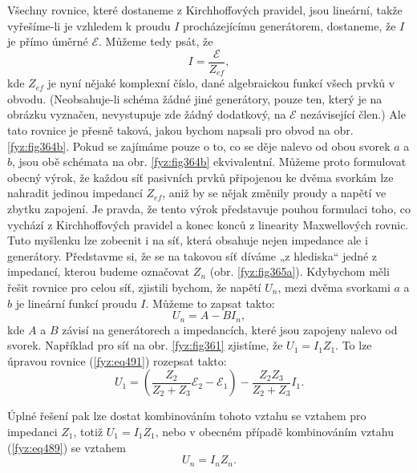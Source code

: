   Všechny rovnice, které dostaneme z Kirchhoffových pravidel, jsou lineární, takže vyřešíme-li je 
  vzhledem k proudu \(I\) procházejícímu generátorem, dostaneme, že \(I\) je přímo úměrné 
  \(\mathscr{E}\). Můžeme tedy psát, že
  \begin{equation*}
    I = \frac{\mathscr{E}}{Z_{ef}},
  \end{equation*}
  kde \(Z_{ef}\) je nyní nějaké komplexní číslo, dané algebraickou funkcí všech prvků v obvodu. 
  (Neobsahuje-li schéma žádné jiné generátory, pouze ten, který je na obrázku vyznačen, nevystupuje 
  zde žádný dodatkový, na \(\mathscr{E}\) nezávisející člen.) Ale tato rovnice je přesně taková, 
  jakou bychom napsali pro obvod na obr. \ref{fyz:fig364b}. Pokud se zajímáme pouze o to, co se 
  děje nalevo od obou svorek \(a\) a \(b\), jsou obě schémata na obr. \ref{fyz:fig364b} 
  ekvivalentní. Můžeme proto formulovat obecný výrok, že každou síť pasivních prvků připojenou ke 
  dvěma svorkám lze nahradit jedinou impedancí \(Z_{ef}\), aniž by se nějak změnily proudy a napětí 
  ve zbytku zapojení. Je pravda, že tento výrok představuje pouhou formulaci toho, co vychází z 
  Kirchhoffových pravidel a konec konců z linearity Maxwellových rovnic. Tuto myšlenku lze zobecnit 
  i na síť, která obsahuje nejen impedance ale i generátory. Představme si, že se na takovou síť 
  díváme „z hlediska“ jedné z impedancí, kterou budeme označovat \(Z_n\) (obr. \ref{fyz:fig365a}). 
  Kdybychom měli řešit rovnice pro celou síť, zjistili bychom, že napětí \(U_n\), mezi dvěma 
  svorkami \(a\) a \(b\) je lineární funkcí proudu \(I\). Můžeme to zapsat takto:
  \begin{equation}\label{fyz:eq489}
    U_n = A - BI_n,
  \end{equation}
  kde \(A\) a \(B\) závisí na generátorech a impedancích, které jsou zapojeny nalevo od svorek. 
  Například pro síť na obr. \ref{fyz:fig361} zjistíme, že \(U_1 = I_1Z_1\). To lze úpravou rovnice 
  (\ref{fyz:eq491}) rozepsat takto: 
  \begin{equation}\label{fyz:eq490}
    U_1 = \left(\frac{Z_2}{Z_2 + Z_3}\mathscr{E_2} - \mathscr{E_1}\right) 
         -\frac{Z_2Z_3}{Z_2 + Z_3}I_1.
  \end{equation}
  
  Úplné řešení pak lze dostat kombinováním tohoto vztahu se vztahem pro impedanci \(Z_1\), totiž 
  \(U_1 = I_1Z_1\), nebo v obecném případě kombinováním vztahu (\ref{fyz:eq489}) se vztahem
  \begin{equation*}
    U_n = I_nZ_n.
  \end{equation*}
  
